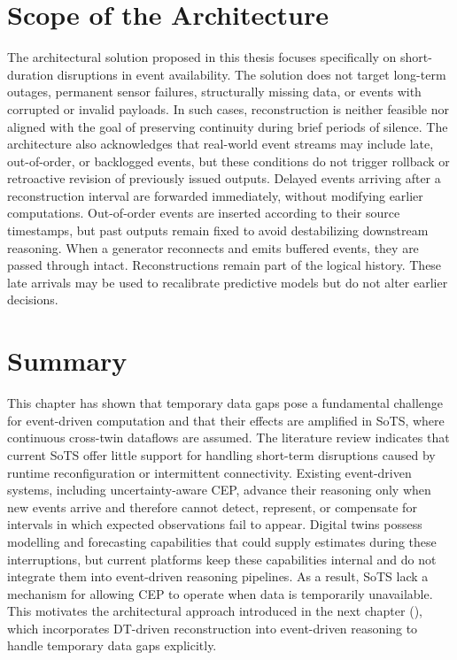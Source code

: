 \section{Scope of the Architecture}

The architectural solution proposed in this thesis focuses specifically on short-duration disruptions in event availability. The solution does not target long-term outages, permanent sensor failures, structurally missing data, or events with corrupted or invalid payloads. In such cases, reconstruction is neither feasible nor aligned with the goal of preserving continuity during brief periods of silence. The architecture also acknowledges that real-world event streams may include late, out-of-order, or backlogged events, but these conditions do not trigger rollback or retroactive revision of previously issued outputs. Delayed events arriving after a reconstruction interval are forwarded immediately, without modifying earlier computations. Out-of-order events are inserted according to their source timestamps, but past outputs remain fixed to avoid destabilizing downstream reasoning. When a generator reconnects and emits buffered events, they are passed through intact. Reconstructions remain part of the logical history. These late arrivals may be used to recalibrate predictive models but do not alter earlier decisions.


\section{Summary}

This chapter has shown that temporary data gaps pose a fundamental challenge for event-driven computation and that their effects are amplified in SoTS, where continuous cross-twin dataflows are assumed. The literature review indicates that current SoTS offer little support for handling short-term disruptions caused by runtime reconfiguration or intermittent connectivity. Existing event-driven systems, including uncertainty-aware CEP, advance their reasoning only when new events arrive and therefore cannot detect, represent, or compensate for intervals in which expected observations fail to appear. Digital twins possess modelling and forecasting capabilities that could supply estimates during these interruptions, but current platforms keep these capabilities internal and do not integrate them into event-driven reasoning pipelines. As a result, SoTS lack a mechanism for allowing CEP to operate when data is temporarily unavailable. This motivates the architectural approach introduced in the next chapter (), which incorporates DT-driven reconstruction into event-driven reasoning to handle temporary data gaps explicitly.

